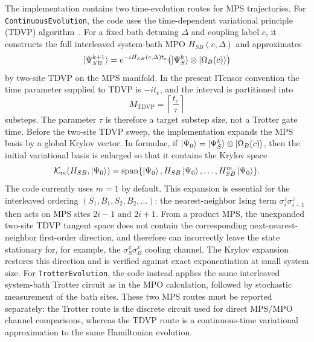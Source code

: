 \documentclass[aps,pra,twocolumn,superscriptaddress,nolongbibliography,nobalancelastpage,10pt]{revtex4-2}
\begin{document}
The implementation contains two time-evolution routes for MPS trajectories.
For \texttt{ContinuousEvolution}, the code uses the time-dependent variational
principle (TDVP) algorithm~\cite{Haegeman2011TimeDependent,Haegeman2016Unifying}.
For a fixed bath detuning \(\Delta\) and coupling label \(c\), it constructs
the full interleaved system-bath MPO \(H_{SB}(c,\Delta)\) and approximates
\begin{equation}
	\ket{\Psi_{SB}^{k+1}}
	=
	e^{-iH_{SB}(c,\Delta)t_e}
	\bigl(\ket{\Psi_S^k}\otimes\ket{\Omega_B(c)}\bigr)
\end{equation}
by two-site TDVP on the MPS manifold.  In the present ITensor convention the
time parameter supplied to TDVP is \(-i t_e\), and the interval is partitioned
into
\begin{equation}
	M_{\mathrm{TDVP}}=\left\lceil \frac{t_e}{\tau}\right\rceil
\end{equation}
substeps.  The parameter \(\tau\) is therefore a target substep size, not a
Trotter gate time.  Before the two-site TDVP sweep, the implementation expands
the MPS basis by a global Krylov vector.  In formulae, if
\(\ket{\Psi_0}=\ket{\Psi_S^k}\otimes\ket{\Omega_B(c)}\), then the
initial variational basis is enlarged so that it contains the Krylov space
\begin{equation}
	\mathcal{K}_m(H_{SB},\ket{\Psi_0})
	=
	\operatorname{span}\{\ket{\Psi_0},H_{SB}\ket{\Psi_0},\ldots,
	H_{SB}^m\ket{\Psi_0}\}.
	\label{eq:TDVPKrylovExpansion}
\end{equation}
The code currently uses \(m=1\) by default.  This expansion is essential for
the interleaved ordering
\((S_1,B_1,S_2,B_2,\ldots)\): the nearest-neighbor Ising term
\(\sigma^z_i\sigma^z_{i+1}\) then acts on MPS sites \(2i-1\) and \(2i+1\).
From a product MPS, the unexpanded two-site TDVP tangent space does not contain
the corresponding next-nearest-neighbor first-order direction, and therefore
can incorrectly leave the state stationary for, for example, the
\(\sigma^x_S\sigma^x_B\) cooling channel.  The Krylov expansion restores this
direction and is verified against exact exponentiation at small system size.
For \texttt{TrotterEvolution}, the code instead applies the
same interleaved system-bath Trotter circuit as in the MPO calculation,
followed by stochastic measurement of the bath sites.  These two MPS routes
must be reported separately: the Trotter route is the discrete circuit used for
direct MPS/MPO channel comparisons, whereas the TDVP route is a continuous-time
variational approximation to the same Hamiltonian evolution.
\end{document}
